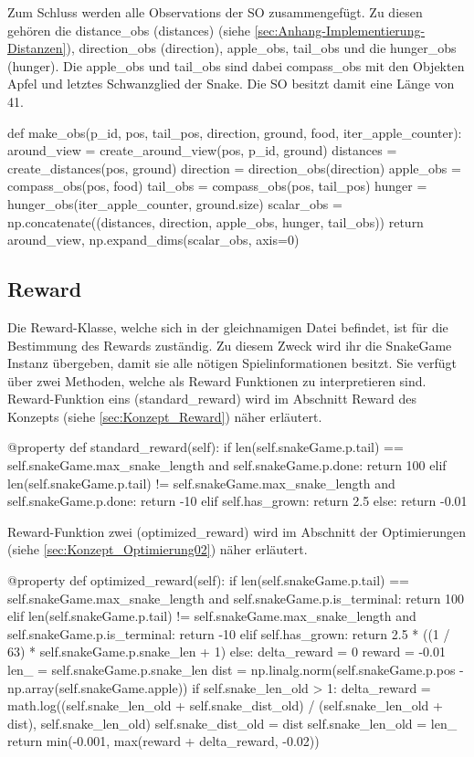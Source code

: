 Zum Schluss werden alle Observations der SO zusammengefügt. Zu diesen gehören die distance\_obs (distances) (siehe \ref{sec:Anhang-Implementierung-Distanzen}), direction\_obs (direction), apple\_obs, tail\_obs und die hunger\_obs (hunger). Die apple\_obs und tail\_obs sind dabei compass\_obs mit den Objekten Apfel und letztes Schwanzglied der Snake. Die SO besitzt damit eine Länge von 41.
\begin{python}
	def make_obs(p_id, pos, tail_pos, direction, ground, food, iter_apple_counter):
				around_view = create_around_view(pos, p_id, ground)
				distances = create_distances(pos, ground)
				direction = direction_obs(direction)
				apple_obs = compass_obs(pos, food)
				tail_obs = compass_obs(pos, tail_pos)
				hunger = hunger_obs(iter_apple_counter, ground.size)
				scalar_obs = np.concatenate((distances, direction, 
										 apple_obs, hunger, tail_obs))
				return around_view, np.expand_dims(scalar_obs, axis=0)
\end{python}

\subsection{Reward} \label{sec:Implementierung_Reward}
Die Reward-Klasse, welche sich in der gleichnamigen Datei befindet, ist für die Bestimmung des Rewards zuständig. Zu diesem Zweck wird ihr die SnakeGame Instanz übergeben, damit sie alle nötigen Spielinformationen besitzt. Sie verfügt über zwei Methoden, welche als Reward Funktionen zu interpretieren sind. Reward-Funktion eins (standard\_reward) wird im Abschnitt Reward des Konzepts (siehe \ref{sec:Konzept_Reward}) näher erläutert.
\begin{python}
	@property
	def standard_reward(self):
		if len(self.snakeGame.p.tail) == self.snakeGame.max_snake_length and self.snakeGame.p.done:
			return 100
		elif len(self.snakeGame.p.tail) != self.snakeGame.max_snake_length and self.snakeGame.p.done:
			return -10
		elif self.has_grown:
			return 2.5
		else:
			return -0.01
\end{python}
Reward-Funktion zwei (optimized\_reward) wird im Abschnitt der Optimierungen (siehe \ref{sec:Konzept_Optimierung02}) näher erläutert.
\begin{python}
	@property
	def optimized_reward(self):
		if len(self.snakeGame.p.tail) == self.snakeGame.max_snake_length and self.snakeGame.p.is_terminal:
			return 100
		elif len(self.snakeGame.p.tail) != self.snakeGame.max_snake_length and self.snakeGame.p.is_terminal:
			return -10
		elif self.has_grown:
			return 2.5 * ((1 / 63) * self.snakeGame.p.snake_len + 1)
		else:
			delta_reward = 0
			reward = -0.01
			len_ = self.snakeGame.p.snake_len
			dist = np.linalg.norm(self.snakeGame.p.pos - 
						   							np.array(self.snakeGame.apple))
			if self.snake_len_old > 1:
				delta_reward = math.log((self.snake_len_old + 
											 self.snake_dist_old) / 
											 (self.snake_len_old + dist), 
											 self.snake_len_old)
			self.snake_dist_old = dist
			self.snake_len_old = len_
			return min(-0.001, max(reward + delta_reward, -0.02))
\end{python}


